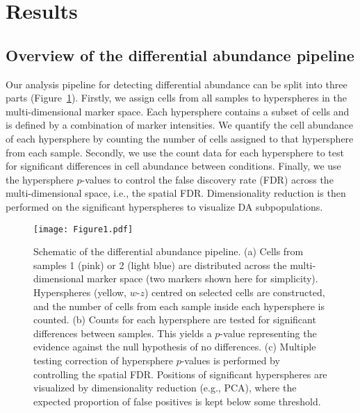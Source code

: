 \documentclass{article}
\begin{document}
\section{Results}
\subsection{Overview of the differential abundance pipeline}
Our analysis pipeline for detecting differential abundance can be split into three parts (Figure~\ref{fig:overview}). 
Firstly, we assign cells from all samples to hyperspheres in the multi-dimensional marker space.
Each hypersphere contains a subset of cells and is defined by a combination of marker intensities.
We quantify the cell abundance of each hypersphere by counting the number of cells assigned to that hypersphere from each sample.
Secondly, we use the count data for each hypersphere to test for significant differences in cell abundance between conditions.
Finally, we use the hypersphere $p$-values to control the false discovery rate (FDR) across the multi-dimensional space, i.e., the spatial FDR.
Dimensionality reduction is then performed on the significant hyperspheres to visualize DA subpopulations.

\begin{figure}[bt]
\begin{center}
    \texttt{[image: Figure1.pdf]}
\end{center}
\caption{Schematic of the differential abundance pipeline.
    (a) Cells from samples 1 (pink) or 2 (light blue) are distributed across the multi-dimensional marker space (two markers shown here for simplicity).
    Hyperspheres (yellow, $w$-$z$) centred on selected cells are constructed, and the number of cells from each sample inside each hypersphere is counted.
    (b) Counts for each hypersphere are tested for significant differences between samples.
    This yields a $p$-value representing the evidence against the null hypothesis of no differences.
    (c) Multiple testing correction of hypersphere $p$-values is performed by controlling the spatial FDR.
    Positions of significant hyperspheres are visualized by dimensionality reduction (e.g., PCA), where the expected proportion of false positives is kept below some threshold.
}
\label{fig:overview}
\end{figure}
\end{document}
